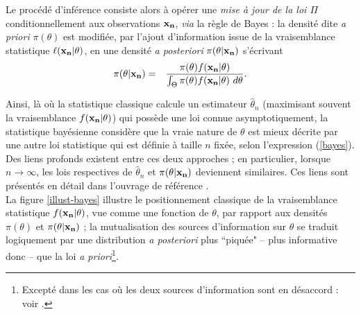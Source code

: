  Le proc\'ed\'e d'inf\'erence  consiste alors \`a op\'erer une {\it mise \`a jour de la loi $\Pi$}  conditionnellement aux observations ${\bf x_n}$, {\it via} la r\`egle de Bayes \cite{Robert2007} : la densit\'e dite {\it a priori} $\pi(\theta)$ est modifi\'ee, par l'ajout d'information issue de la vraisemblance statistique $\ell({\bf x_n}|\theta)$, en une densit\'e {\it a posteriori} $\pi(\theta|{\bf x_n})$ s'\'ecrivant 
\begin{eqnarray}
\pi(\theta|{\bf x_n}) & = & \frac{\pi(\theta) f({\bf x_n}|\theta)}{\int_{\Theta}  \pi(\theta) f({\bf x_n}|\theta) \ d\theta}.\label{bayes}
\end{eqnarray}

Ainsi, l\`a o\`u la statistique classique calcule un estimateur $\hat\theta_n$ (maximisant souvent la vraisemblance $f({\bf x_n}|\theta)$) qui poss\`ede une loi connue asymptotiquement,  la statistique bay\'esienne consid\`ere que la vraie nature de $\theta$ est mieux d\'ecrite par une autre loi statistique qui est d\'efinie \`a taille $n$ fix\'ee, selon l'expression (\ref{bayes}). Des liens profonds existent entre ces deux approches ; en particulier, lorsque $n\to\infty$, les lois respectives de $\hat\theta_n$ et  $\pi(\theta|{\bf x_n})$ deviennent similaires. Ces liens sont pr\'esent\'es en d\'etail dans l'ouvrage de r\'ef\'erence \cite{Robert2007}. \\

La figure \ref{illust-bayes} illustre le positionnement classique de la vraisemblance statistique $f({\bf x_n}|\theta)$, vue comme une fonction de $\theta$, par rapport aux densit\'es $\pi(\theta)$ et $\pi(\theta|{\bf x_n})$ ; la mutualisation des sources d'information sur $\theta$ se traduit logiquement par une distribution {\it a posteriori} plus ``piqu\'ee" -- plus informative donc -- que la loi {\it a priori}\footnote{Except\'e dans les cas o\`u les deux sources d'information sont en d\'esaccord : voir \cite{Evans2006}.}. \\



